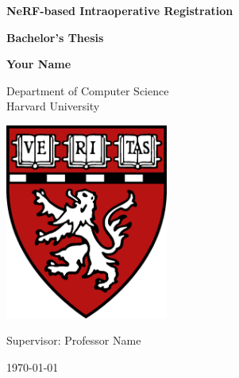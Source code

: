 \begin{titlepage}
    \centering
    \vspace*{1cm}
    
    \Huge
    \textbf{NeRF-based Intraoperative Registration}
    
    \vspace{0.5cm}
    \LARGE
    \textbf{Bachelor's Thesis}
    
    \vspace{1.5cm}
    
    \textbf{Your Name}
    
    \vspace{1cm}
    
    \Large
    Department of Computer Science\\
    Harvard University
    
    \vfill
    
    \includegraphics[width=0.4\textwidth]{figures/harvard_logo.png}
    
    \vspace{1cm}
    
    \Large
    Supervisor: Professor Name\\
    
    \vspace{0.8cm}
    
    \Large
    \today
    
\end{titlepage} 